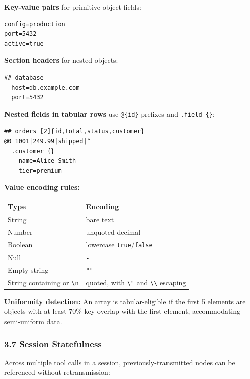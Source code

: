 \documentclass[
  11pt,
  paper=a4,
  ,captions=tableheading
]{scrartcl}
\newcounter{none} %
\begin{document}
\textbf{Key-value pairs} for primitive object fields:

\begin{verbatim}
config=production
port=5432
active=true
\end{verbatim}

\textbf{Section headers} for nested objects:

\begin{verbatim}
## database
  host=db.example.com
  port=5432
\end{verbatim}

\textbf{Nested fields in tabular rows} use \texttt{@\{id\}} prefixes and
\texttt{.field\ \{\}}:

\begin{verbatim}
## orders [2]{id,total,status,customer}
@0 1001|249.99|shipped|^
  .customer {}
    name=Alice Smith
    tier=premium
\end{verbatim}

\textbf{Value encoding rules:}

{\def\LTcaptype{none} %
\begin{longtable}[]{@{}ll@{}}
\toprule\noalign{}
Type & Encoding \\
\midrule\noalign{}
\endhead
\bottomrule\noalign{}
\endlastfoot
String & bare text \\
Number & unquoted decimal \\
Boolean & lowercase \texttt{true}/\texttt{false} \\
Null & \texttt{-} \\
Empty string & \texttt{""} \\
String containing \texttt{\textbar{}} or \texttt{\textbackslash{}n} &
quoted, with \texttt{\textbackslash{}"} and
\texttt{\textbackslash{}\textbackslash{}} escaping \\
\end{longtable}
}

\textbf{Uniformity detection:} An array is tabular-eligible if the first
5 elements are objects with at least 70\% key overlap with the first
element, accommodating semi-uniform data.

\subsubsection{3.7 Session Statefulness}\label{session-statefulness}

Across multiple tool calls in a session, previously-transmitted nodes
can be referenced without retransmission:
\end{document}
